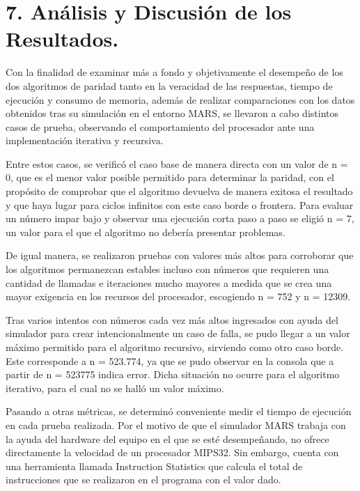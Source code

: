 \documentclass[12pt, letterpaper]{article}
\begin{document}
\newpage
\section*{7. \textbf{Análisis y Discusión de los Resultados.}} 

Con la finalidad de examinar más a fondo y objetivamente el desempeño de los dos algoritmos de paridad tanto en la veracidad de las respuestas, tiempo de ejecución y consumo de memoria, además de realizar comparaciones con los datos obtenidos tras su simulación en el entorno MARS, se llevaron a cabo distintos casos de prueba, observando el comportamiento del procesador ante una implementación iterativa y recursiva.

Entre estos casos, se verificó el caso base de manera directa con un valor de n = 0, que es el menor valor posible permitido para determinar la paridad, con el propósito de comprobar que el algoritmo devuelva de manera exitosa el resultado y que haya lugar para ciclos infinitos con este caso borde o frontera. Para evaluar un número impar bajo y observar una ejecución corta paso a paso se eligió n = 7, un valor para el que el algoritmo no debería presentar problemas. 

De igual manera, se realizaron pruebas con valores más altos para corroborar que los algoritmos permanezcan estables incluso con números que requieren una cantidad de llamadas e iteraciones mucho mayores a medida que se crea una mayor exigencia en los recursos del procesador, escogiendo n = 752 y n = 12309. 

Tras varios intentos con números cada vez más altos ingresados con ayuda del simulador para crear intencionalmente un caso de falla, se pudo llegar a un valor máximo permitido para el algoritmo recursivo, sirviendo como otro caso borde. Este corresponde a n = 523.774, ya que se pudo observar en la consola que a partir de n = 523775 indica error. Dicha situación no ocurre para el algoritmo iterativo, para el cual no se halló un valor máximo. 

Pasando a otras métricas, se determinó conveniente medir el tiempo de ejecución en cada prueba realizada. Por el motivo de que el simulador MARS trabaja con la ayuda del hardware del equipo en el que se esté desempeñando, no ofrece directamente la velocidad de un procesador MIPS32. Sin embargo, cuenta con una herramienta llamada Instruction Statistics que calcula el total de instrucciones que se realizaron en el programa con el valor dado. 
\end{document}
